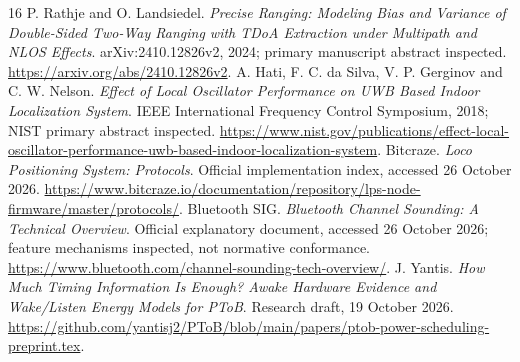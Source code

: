 \documentclass[11pt,letterpaper]{article}
\begin{document}
\begin{thebibliography}{16}
 P. Rathje and O. Landsiedel. \emph{Precise Ranging: Modeling Bias and Variance of Double-Sided Two-Way Ranging with TDoA Extraction under Multipath and NLOS Effects}. arXiv:2410.12826v2, 2024; primary manuscript abstract inspected. \url{https://arxiv.org/abs/2410.12826v2}.
 A. Hati, F. C. da Silva, V. P. Gerginov and C. W. Nelson. \emph{Effect of Local Oscillator Performance on UWB Based Indoor Localization System}. IEEE International Frequency Control Symposium, 2018; NIST primary abstract inspected. \url{https://www.nist.gov/publications/effect-local-oscillator-performance-uwb-based-indoor-localization-system}.
 Bitcraze. \emph{Loco Positioning System: Protocols}. Official implementation index, accessed 26 October 2026. \url{https://www.bitcraze.io/documentation/repository/lps-node-firmware/master/protocols/}.
 Bluetooth SIG. \emph{Bluetooth Channel Sounding: A Technical Overview}. Official explanatory document, accessed 26 October 2026; feature mechanisms inspected, not normative conformance. \url{https://www.bluetooth.com/channel-sounding-tech-overview/}.
 J. Yantis. \emph{How Much Timing Information Is Enough? Awake Hardware Evidence and Wake/Listen Energy Models for PToB}. Research draft, 19 October 2026. \url{https://github.com/yantisj2/PToB/blob/main/papers/ptob-power-scheduling-preprint.tex}.
\end{thebibliography}
\end{document}
